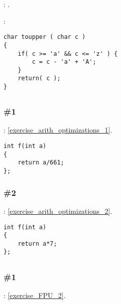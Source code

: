 : .

:

\begin{lstlisting}
char toupper ( char c )
{
    if( c >= 'a' && c <= 'z' ) {
        c = c - 'a' + 'A';
    }
    return( c );
}
\end{lstlisting}

\subsection{}

\subsubsection{\Exercise \#1}
\label{exercise_solutions_arith_optimizations_1}

\Exercise: \ref{exercise_arith_optimizations_1}.

\begin{lstlisting}
int f(int a)
{
	return a/661;
};
\end{lstlisting}

\subsubsection{\Exercise \#2}
\label{exercise_solutions_arith_optimizations_2}

\Exercise: \ref{exercise_arith_optimizations_2}.

\begin{lstlisting}
int f(int a)
{
	return a*7;
};
\end{lstlisting}

\subsection{}

\subsubsection{\Exercise \#1}
\label{exercise_solutions_FPU_2}

\Exercise: \ref{exercise_FPU_2}.


